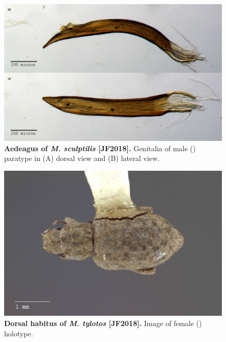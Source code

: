 \documentclass[fleqn,10pt,lineno]{wlpeerj} %
\begin{document}
\begin{figure}[h]
	\centering
	\begin{sideways}
		\includegraphics[width=0.95\textheight]{figure29.jpg}
	\end{sideways}
	\caption{\textbf{Aedeagus of \textit{M. sculptilis} [JF2018].} Genitalia of male (\male) paratype in (A) dorsal view and (B) lateral view.}
	\label{fig:sculptilis_aedeagus}
\end{figure}

\begin{figure}[h]
	\begin{sideways}
		\centering
		\includegraphics[height=\textwidth]{figure30.jpg}
	\end{sideways}
	\caption{\textbf{Dorsal habitus of \textit{M. tylotos} [JF2018].} Image of female (\female) holotype.}
	\label{fig:tylotos_F_dorsal}
\end{figure}
\end{document}
